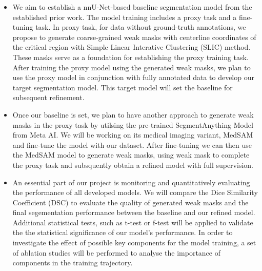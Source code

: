 \begin{itemize}

\item We aim to establish a nnU-Net-based baseline segmentation model from the established prior work. The model training includes a proxy task and a fine-tuning task. In proxy task, for data without ground-truth annotations, we propose to generate coarse-grained weak masks with centerline coordinates of the critical region with Simple Linear Interative Clustering (SLIC) method. These masks serve as a foundation for establishing the proxy training task. After training the proxy model using the generated weak masks, we plan to use the proxy model in conjunction with fully annotated data to develop our target segmentation model. This target model will set the baseline for subsequent refinement.
\item Once our baseline is set, we plan to have another approach to generate weak masks in the proxy task by utilsing the pre-trained SegmentAnything Model \cite{kirillov2023segany} from Meta AI. We will be working on its medical imaging variant, MedSAM and fine-tune the model with our dataset. After fine-tuning we can then use the MedSAM model to generate weak masks, using weak mask to complete the proxy task and subsquently obtain a refined model with full supervision.

\item An essential part of our project is monitoring and quantitatively evaluating the performance of all developed models. We will compare the Dice Similarity Coefficient (DSC) to evaluate the quality of generated weak masks and the final segementation performance between the baseline and our refined model. Additional statistical tests, such as t-test or f-test will be applied to validate the the statistical significance of our model's performance. In order to investigate the effect of possible key components for the model training, a set of ablation studies will be performed to analyse the importance of components in the training trajectory. 
\end{itemize}